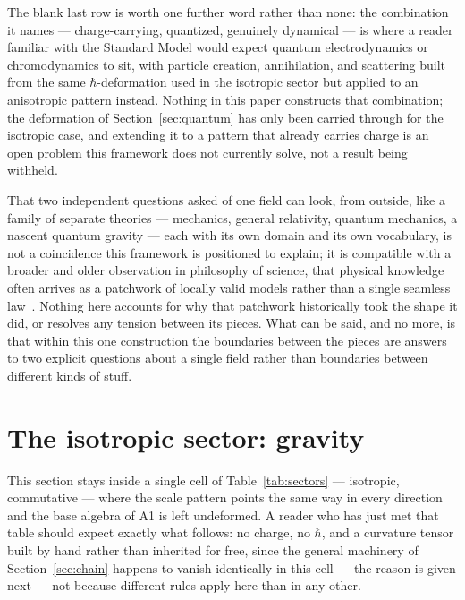 \documentclass[pdflatex,sn-mathphys-num]{sn-jnl}
\theoremstyle{thmstyleone}
\theoremstyle{thmstylethree}
\theoremstyle{thmstyletwo}
\begin{document}
The blank last row is worth one further word rather than none: the
combination it names — charge-carrying, quantized, genuinely dynamical —
is where a reader familiar with the Standard Model would expect quantum
electrodynamics or chromodynamics to sit, with particle creation,
annihilation, and scattering built from the same $\hbar$-deformation used
in the isotropic sector but applied to an anisotropic pattern instead.
Nothing in this paper constructs that combination; the deformation of
Section~\ref{sec:quantum} has only been carried through for the isotropic
case, and extending it to a pattern that already carries charge is an
open problem this framework does not currently solve, not a result being
withheld.

That two independent questions asked of one field can look, from
outside, like a family of separate theories — mechanics, general
relativity, quantum mechanics, a nascent quantum gravity — each with its
own domain and its own vocabulary, is not a coincidence this framework is
positioned to explain; it is compatible with a broader and older
observation in philosophy of science, that physical knowledge often
arrives as a patchwork of locally valid models rather than a single
seamless law~\cite{Cartwright1999}. Nothing here accounts for why that
patchwork historically took the shape it did, or resolves any tension
between its pieces. What can be said, and no more, is that within this
one construction the boundaries between the pieces are answers to two
explicit questions about a single field rather than boundaries between
different kinds of stuff.

\section{The isotropic sector: gravity}\label{sec:gravity}

This section stays inside a single cell of Table~\ref{tab:sectors} —
isotropic, commutative — where the scale pattern points the same way in
every direction and the base algebra of A1 is left undeformed. A reader
who has just met that table should expect exactly what follows: no
charge, no $\hbar$, and a curvature tensor built by hand rather than
inherited for free, since the general machinery of Section~\ref{sec:chain}
happens to vanish identically in this cell — the reason is given next —
not because different rules apply here than in any other.
\end{document}
